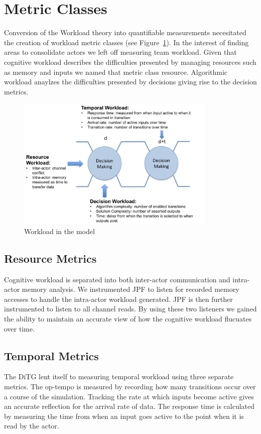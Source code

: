 \section{Metric Classes}
Conversion of the Workload theory into quantifiable measurements necesitated the creation of workload metric classes (see Figure~\ref{fig:WorkloadMetrics}). In the interest of finding areas to consolidate actors we left off measuring team workload. Given that cognitive workload describes the difficulties presented by managing resources such as memory and inputs we named that metric class resource. Algorithmic workload anaylzes the difficulties presented by decisions giving rise to the decision metrics.


\begin{figure}[h]
\center
\setlength{\abovecaptionskip}{1mm}
\setlength{\belowcaptionskip}{1mm}
\setlength{\textfloatsep}{1mm}
\setlength{\floatsep}{1mm}
\includegraphics[height=2.5in]{WorkloadMetrics.png}
\caption{Workload in the model}
\label{fig:WorkloadMetrics}
\end{figure}

\subsection{Resource Metrics}
Cognitive workload is separated into both inter-actor communication and intra-actor memory analysis. We instrumented JPF to listen for recorded memory accesses to handle the intra-actor workload generated. JPF is then further instrumented to listen to all channel reads. By using these two listeners we gained the ability to maintain an accurate view of how the cognitive workload flucuates over time.

\subsection{Temporal Metrics}
The DiTG lent itself to measuring temporal workload using three separate metrics. The op-tempo is measured by recording how many transitions occur over a course of the simulation. Tracking the rate at which inputs become active gives an accurate reflection for the arrival rate of data. The response time is calculated by measuring the time from when an input goes active to the point when it is read by the actor.

